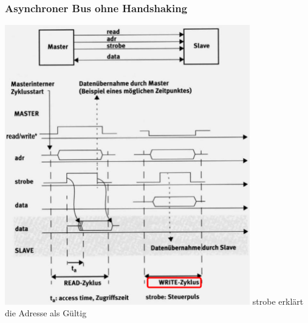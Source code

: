 \begin{multicols}{2}
    \begin{minipage}{\linewidth}
        \subsubsection{Asynchroner Bus ohne Handshaking}
        \includegraphics[width=0.8\textwidth]{images/SystembusSpeicherSpeichersystem/AsyBusoHand}\newline
        strobe erklärt die Adresse als Gültig
    \end{minipage}

    \begin{minipage}{\linewidth}

\end{minipage}
\end{multicols}
